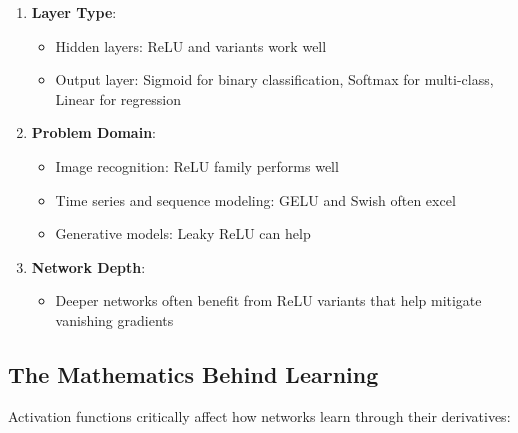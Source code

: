 \documentclass[
  letterpaper,
  DIV=11,
  numbers=noendperiod]{scrreprt}
\providecommand{\tightlist}{%
  \setlength{\itemsep}{0pt}\setlength{\parskip}{0pt}}\usepackage{longtable,booktabs,array}
\begin{document}
\begin{enumerate}
\def\labelenumi{\arabic{enumi}.}
\tightlist
\item
  \textbf{Layer Type}:

  \begin{itemize}
  \tightlist
  \item
    Hidden layers: ReLU and variants work well
  \item
    Output layer: Sigmoid for binary classification, Softmax for
    multi-class, Linear for regression
  \end{itemize}
\item
  \textbf{Problem Domain}:

  \begin{itemize}
  \tightlist
  \item
    Image recognition: ReLU family performs well
  \item
    Time series and sequence modeling: GELU and Swish often excel
  \item
    Generative models: Leaky ReLU can help
  \end{itemize}
\item
  \textbf{Network Depth}:

  \begin{itemize}
  \tightlist
  \item
    Deeper networks often benefit from ReLU variants that help mitigate
    vanishing gradients
  \end{itemize}
\end{enumerate}

\subsection{The Mathematics Behind
Learning}\label{the-mathematics-behind-learning}

Activation functions critically affect how networks learn through their
derivatives:
\end{document}
